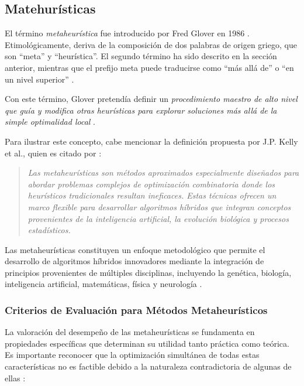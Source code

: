 \documentclass[12pt,titlepage,twoside,openright]{book}
\begin{document}
\subsection{Matehurísticas}

El término \textit{metaheurística} fue introducido por Fred Glover en 1986 \citep{antonioSuarez2014}. Etimológicamente, deriva de la composición de dos palabras de origen griego, que son “meta” y “heurística”. El segundo término ha sido descrito en la sección anterior, mientras que el prefijo meta puede traducirse como “más allá de” o “en un nivel superior” \citep{duarte2007metaheuristicas}.

Con este término, Glover pretendía definir un \textit{procedimiento maestro de alto nivel que guía y modifica otras heurísticas para explorar soluciones más allá de la simple optimalidad local} \citep{duarte2007metaheuristicas}.

Para ilustrar este concepto, cabe mencionar la definición propuesta por J.P. Kelly et al., quien es citado por \citep{duarte2007metaheuristicas}:

\begin{quote}
	\textit{Las metaheurísticas son métodos aproximados especialmente diseñados para abordar problemas complejos de optimización combinatoria donde los heurísticos tradicionales resultan ineficaces. Estas técnicas ofrecen un marco flexible para desarrollar algoritmos híbridos que integran conceptos provenientes de la inteligencia artificial, la evolución biológica y procesos estadísticos.}
\end{quote}

Las metaheurísticas constituyen un enfoque metodológico que permite el desarrollo de algoritmos híbridos innovadores mediante la integración de principios provenientes de múltiples disciplinas, incluyendo la genética, biología, inteligencia artificial, matemáticas, física y neurología \citep{antonioSuarez2014}.

\subsubsection{Criterios de Evaluación para Métodos Metaheurísticos}

La valoración del desempeño de las metaheurísticas se fundamenta en propiedades específicas que determinan su utilidad tanto práctica como teórica. Es importante reconocer que la optimización simultánea de todas estas características no es factible debido a la naturaleza contradictoria de algunas de ellas \citep{antonioSuarez2014}:
\end{document}
